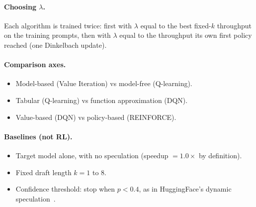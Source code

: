 \paragraph{Choosing $\lambda$.} Each algorithm is trained twice: first with $\lambda$ equal to the best
fixed-$k$ throughput on the training prompts, then with $\lambda$ equal to the throughput its own first policy
reached (one Dinkelbach update).

\paragraph{Comparison axes.}
\begin{itemize}
  \item Model-based (Value Iteration) vs model-free (Q-learning).
  \item Tabular (Q-learning) vs function approximation (DQN).
  \item Value-based (DQN) vs policy-based (REINFORCE).
\end{itemize}

\paragraph{Baselines (not RL).}
\begin{itemize}
  \item Target model alone, with no speculation (speedup $= 1.0\times$ by definition).
  \item Fixed draft length $k = 1$ to $8$.
  \item Confidence threshold: stop when $p < 0.4$, as in HuggingFace's dynamic speculation~\citep{hfdynamic}.
\end{itemize}
